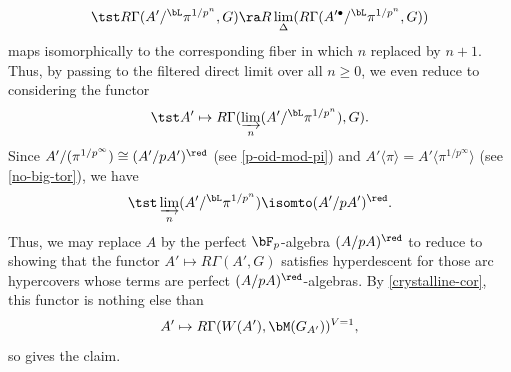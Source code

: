 \[
\tst R\Gamma(A'/^\bL \pi^{1/p^n}, G) \ra R\lim_\Delta( R\Gamma(A'^\bullet/^\bL \pi^{1/p^n}, G))
\]
maps isomorphically to the corresponding fiber in which $n$ replaced by $n + 1$. Thus, by passing to the filtered direct limit over all $n \ge 0$, we even reduce to considering the functor %
\[
\tst A' \mapsto R\Gamma(\varinjlim_n (A'/^\bL \pi^{1/p^n}), G).
\]
Since $A'/ (\pi^{1/p^\infty}) \cong (A'/pA')^\red$ (see \eqref{p-oid-mod-pi}) and $A'\langle \pi\rangle = A'\langle \pi^{1/p^\infty} \rangle$ (see \eqref{no-big-tor}), we have
\[
\tst \varinjlim_n (A'/^\bL \pi^{1/p^n}) \isomto (A'/pA')^\red.
\]
Thus, we may replace $A$ by the perfect $\bF_p$-algebra $(A/pA)^\red$ to reduce to showing that the functor $A' \mapsto R\Gamma(A', G)$ satisfies hyperdescent for those arc hypercovers whose terms are perfect $(A/pA)^\red$-algebras. By \eqref{crystalline-cor}, this functor is nothing else than
\[
A' \mapsto R\Gamma(W(A'), \bM(G_{A'}))^{V = 1},
\]
so  gives the claim.
\epf















